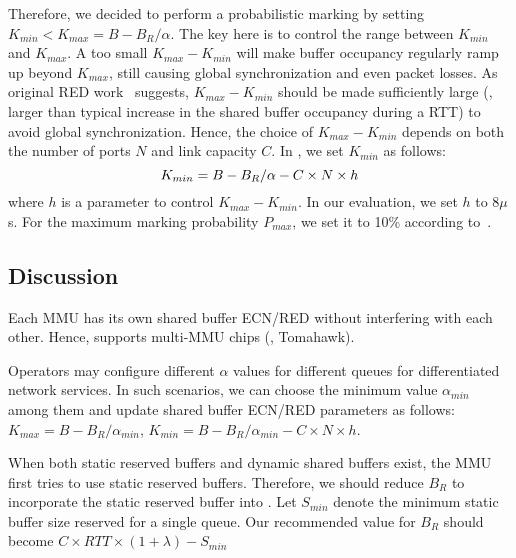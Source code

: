 Therefore, we decided to perform a probabilistic marking by setting $K_{min}<K_{max}=B-B_{R}/\alpha$. The key here is to control the range between $K_{min}$ and $K_{max}$. A too small $K_{max}-K_{min}$ will make buffer occupancy regularly ramp up beyond $K_{max}$, still causing global synchronization and even packet losses. As original RED work~\cite{RED} suggests, $K_{max}-K_{min}$ should be made sufficiently large (\eg, larger than typical increase in the shared buffer occupancy during a RTT) to avoid global synchronization. Hence, the choice of $K_{max}-K_{min}$ depends on both the number of ports $N$ and link capacity $C$. In \sys, we set $K_{min}$ as follows:
\vspace{-3mm}
\begin{equation}
\vspace{-1mm}
\displaystyle K_{min}=B-B_{R}/\alpha-C\times N\times h\label{eq:k_min}
\vspace{-1mm}
\end{equation}
where $h$ is a parameter to control $K_{max}-K_{min}$. In our evaluation, we set $h$ to 8$\mu$s. For the maximum marking probability $P_{max}$, we set it to 10\% according to~\cite{RED}. 

\subsection{Discussion}\label{subsec:discussion}
\vspace{-1mm}
Each MMU has its own shared buffer ECN/RED without interfering with each other. Hence, \sys supports multi-MMU chips (\eg, Tomahawk).

\vspace{-1mm}
Operators may configure different $\alpha$ values for different queues for differentiated network services. In such scenarios, we can choose the minimum value $\alpha_{min}$ among them and update shared buffer ECN/RED parameters as follows: $K_{max}=B-B_{R}/\alpha_{min}$, $K_{min}=B-B_{R}/\alpha_{min}-C\times N\times h$.

\vspace{-1mm}
When both static reserved buffers and dynamic shared buffers exist, the MMU first tries to use static reserved buffers. Therefore, we should reduce $B_R$ to incorporate the static reserved buffer into \sys. Let $S_{min}$ denote the minimum static buffer size reserved for a single queue. Our recommended value for $B_R$ should become $C\times RTT\times (1+\lambda)-S_{min}$




